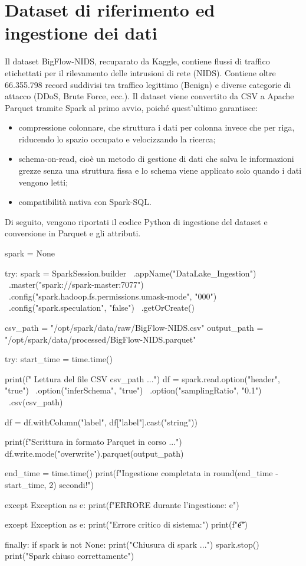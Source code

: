 \documentclass[10pt,a4paper]{article}
\begin{document}
    \section{Dataset di riferimento ed ingestione dei dati}   
    Il dataset BigFlow-NIDS, recuparato da Kaggle, contiene flussi di traffico etichettati per il rilevamento delle
    intrusioni di rete (NIDS). Contiene oltre 66.355.798 record suddivisi tra traffico legittimo (Benign) e diverse
    categorie di attacco (DDoS, Brute Force, ecc.).
    Il dataset viene convertito da CSV a Apache Parquet tramite Spark al primo avvio, poiché quest'ultimo garantisce:
    \begin{itemize}
        \item compressione colonnare, che struttura i dati per colonna invece che per riga, riducendo lo spazio occupato e velocizzando la ricerca;
        \item schema-on-read, cioè un metodo di gestione di dati che salva le informazioni grezze senza una struttura fissa e lo schema viene applicato solo quando i dati vengono letti;
        \item compatibilità nativa con Spark-SQL.
    \end{itemize}
    \noindent
    Di seguito, vengono riportati il codice Python di ingestione del dataset e conversione in Parquet e gli attributi.
    \begin{pylisting}[style=pystyle, caption={Ingestione CSV e conversione in Parquet}, label=lst:ingest]
    spark = None

    try:
        spark = SparkSession.builder \
            .appName("DataLake_Ingestion") \
            .master("spark://spark-master:7077") \
            .config("spark.hadoop.fs.permissions.umask-mode", "000") \
            .config("spark.speculation", "false") \
            .getOrCreate()

        csv_path = "/opt/spark/data/raw/BigFlow-NIDS.csv"
        output_path = "/opt/spark/data/processed/BigFlow-NIDS.parquet"

        try:
            start_time = time.time()

            print(f" Lettura del file CSV {csv_path} ...")
            df = spark.read.option("header", "true") \
               .option("inferSchema", "true") \
               .option("samplingRatio", "0.1") \
               .csv(csv_path)

            df = df.withColumn("label", df["label"].cast("string"))

            print(f"Scrittura in formato Parquet in corso ...")
            df.write.mode("overwrite").parquet(output_path)

            end_time = time.time()
            print(f"Ingestione completata in {round(end_time - start_time, 2)} secondi!")

        except Exception as e:
            print(f"ERRORE durante l'ingestione: {e}")

    except Exception as e:
        print("Errore critico di sistema:")
        print(f"\t{e}")

    finally:
        if spark is not None:
            print("Chiusura di spark ...")
            spark.stop()
            print("Spark chiuso correttamente")
    \end{pylisting}
\end{document}

